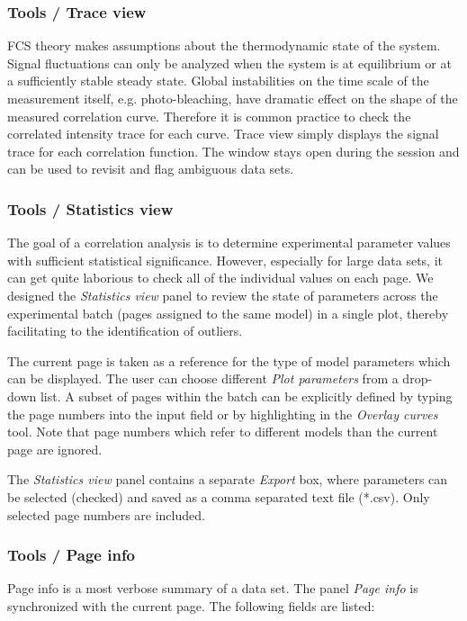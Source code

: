 \subsubsection{Tools / Trace view}
\label{sec:tm.tv}
FCS theory makes assumptions about the thermodynamic state of the system. Signal fluctuations can only be analyzed when the system is at equilibrium or at a sufficiently stable steady state. Global instabilities on the time scale of the measurement itself, e.g. photo-bleaching, have dramatic effect on the shape of the measured correlation curve. Therefore it is common practice to check the correlated intensity trace for each curve. Trace view simply displays the signal trace for each correlation function. The window stays open during the session and can be used to revisit and flag ambiguous data sets.

\subsubsection{Tools / Statistics view}
\label{sec:tm.sv}
The goal of a correlation analysis is to determine experimental parameter values with sufficient statistical significance. However, especially for large data sets, it can get quite laborious to check all of the individual values on each page. We designed the \textit{Statistics view} panel to review the state of parameters across the experimental batch (pages assigned to the same model) in a single plot, thereby facilitating to the identification of outliers.

The current page is taken as a reference for the type of model parameters which can be displayed. The user can choose different \textit{Plot parameters} from a drop-down list. A subset of pages within the batch can be explicitly defined by typing the page numbers into the input field or by highlighting in the \textit{Overlay curves} tool. Note that page numbers which refer to different models than the current page are ignored. 

The \textit{Statistics view} panel contains a separate \textit{Export} box, where parameters can be selected (checked) and saved as a comma separated text file (*.csv). Only selected page numbers are included.

\subsubsection{Tools / Page info}
\label{sec:tm.pi}
Page info is a most verbose summary of a data set. The panel \textit{Page info} is synchronized with the current page. The following fields are listed:


